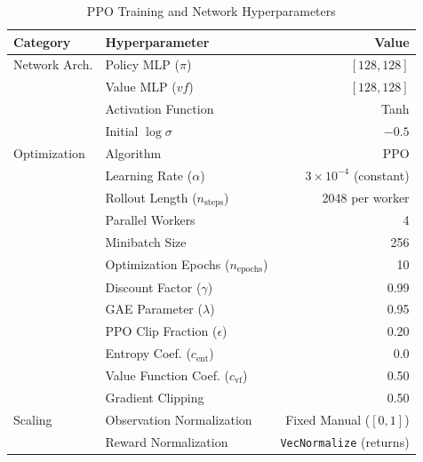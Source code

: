 \documentclass[conference]{IEEEtran}
\begin{document}
\begin{table}[t]
\caption{PPO Training and Network Hyperparameters}
\centering
\begin{tabular}{llr}
\toprule
\textbf{Category} & \textbf{Hyperparameter} & \textbf{Value} \\
\midrule
Network Arch. & Policy MLP ($\pi$) & $[128, 128]$ \\
              & Value MLP ($vf$) & $[128, 128]$ \\
              & Activation Function & Tanh \\
              & Initial $\log \sigma$ & $-0.5$ \\
\midrule
Optimization  & Algorithm & PPO \cite{schulman2017proximal} \\
              & Learning Rate ($\alpha$) & $3 \times 10^{-4}$ (constant) \\
              & Rollout Length ($n_{\text{steps}}$) & 2048 per worker \\
              & Parallel Workers & 4 \\
              & Minibatch Size & 256 \\
              & Optimization Epochs ($n_{\text{epochs}}$) & 10 \\
              & Discount Factor ($\gamma$) & 0.99 \\
              & GAE Parameter ($\lambda$) & 0.95 \\
              & PPO Clip Fraction ($\epsilon$) & 0.20 \\
              & Entropy Coef. ($c_{\text{ent}}$) & 0.0 \\
              & Value Function Coef. ($c_{\text{vf}}$) & 0.50 \\
              & Gradient Clipping & 0.50 \\
\midrule
Scaling       & Observation Normalization & Fixed Manual ($[0, 1]$) \\
              & Reward Normalization & \texttt{VecNormalize} (returns) \\
\bottomrule
\end{tabular}
\label{tab:hyperparams}
\end{table}
\end{document}
